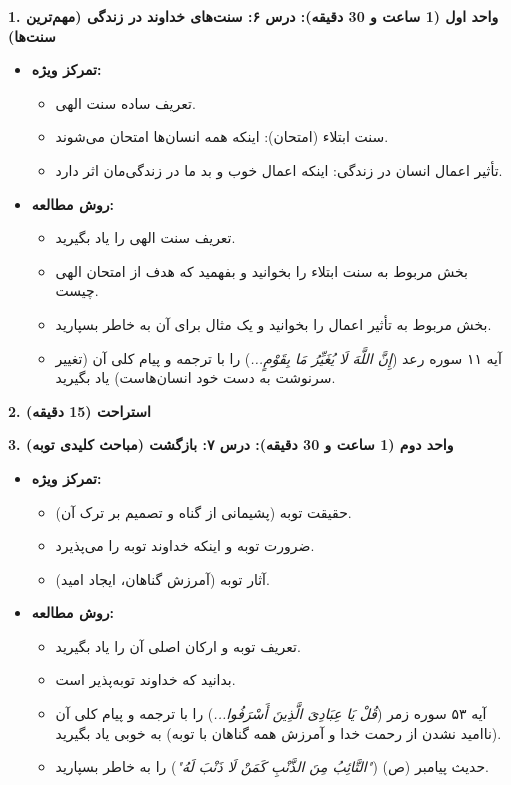\documentclass[12pt,a4paper]{article}
\newcommand{\quranverse}[1]{\textit{#1}}
\newcommand{\hadith}[1]{\textit{#1}}
\begin{document}
\textbf{1. واحد اول (1 ساعت و 30 دقیقه): درس ۶: سنت‌های خداوند در زندگی (مهم‌ترین سنت‌ها)}
\begin{itemize}
    \item \textbf{تمرکز ویژه:}
    \begin{itemize}
        \item تعریف ساده سنت الهی.
        \item سنت ابتلاء (امتحان): اینکه همه انسان‌ها امتحان می‌شوند.
        \item تأثیر اعمال انسان در زندگی: اینکه اعمال خوب و بد ما در زندگی‌مان اثر دارد.
    \end{itemize}
    \item \textbf{روش مطالعه:}
    \begin{itemize}
        \item تعریف سنت الهی را یاد بگیرید.
        \item بخش مربوط به سنت ابتلاء را بخوانید و بفهمید که هدف از امتحان الهی چیست.
        \item بخش مربوط به تأثیر اعمال را بخوانید و یک مثال برای آن به خاطر بسپارید.
        \item آیه ۱۱ سوره رعد (\quranverse{إِنَّ اللَّهَ لَا یُغَیِّرُ مَا بِقَوْمٍ...}) را با ترجمه و پیام کلی آن (تغییر سرنوشت به دست خود انسان‌هاست) یاد بگیرید.
    \end{itemize}
\end{itemize}

\textbf{2. استراحت (15 دقیقه)}
\vspace{0.5em}

\textbf{3. واحد دوم (1 ساعت و 30 دقیقه): درس ۷: بازگشت (مباحث کلیدی توبه)}
\begin{itemize}
    \item \textbf{تمرکز ویژه:}
    \begin{itemize}
        \item حقیقت توبه (پشیمانی از گناه و تصمیم بر ترک آن).
        \item ضرورت توبه و اینکه خداوند توبه را می‌پذیرد.
        \item آثار توبه (آمرزش گناهان، ایجاد امید).
    \end{itemize}
    \item \textbf{روش مطالعه:}
    \begin{itemize}
        \item تعریف توبه و ارکان اصلی آن را یاد بگیرید.
        \item بدانید که خداوند توبه‌پذیر است.
        \item آیه ۵۳ سوره زمر (\quranverse{قُلْ یَا عِبَادِیَ الَّذِینَ أَسْرَفُوا...}) را با ترجمه و پیام کلی آن (ناامید نشدن از رحمت خدا و آمرزش همه گناهان با توبه) به خوبی یاد بگیرید.
        \item حدیث پیامبر (ص) (\hadith{"التَّائِبُ مِنَ الذَّنْبِ کَمَنْ لَا ذَنْبَ لَهُ"}) را به خاطر بسپارید.
    \end{itemize}
\end{itemize}
\end{document}
